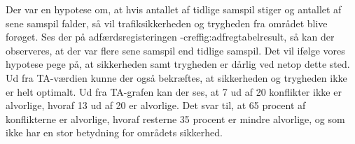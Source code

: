 Der var en hypotese om, at hvis antallet af tidlige samspil stiger og antallet af sene samspil falder, så vil trafiksikkerheden og trygheden fra området blive forøget. Ses der på adfærdsregisteringen -cref{fig:adfregtabelresult}, så kan der observeres, at der var flere sene samspil end tidlige samspil. Det vil ifølge vores hypotese pege på, at sikkerheden samt trygheden er dårlig ved netop dette sted. Ud fra TA-værdien kunne der også bekræftes, at sikkerheden og trygheden ikke er helt optimalt.
Ud fra TA-grafen kan der ses, at 7 ud af 20 konflikter ikke er alvorlige, hvoraf 13 ud af 20 er alvorlige. Det svar til, at 65 procent af konflikterne er alvorlige, hvoraf resterne 35 procent er mindre alvorlige, og som ikke har en stor betydning for områdets sikkerhed.
